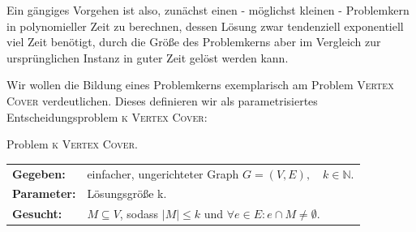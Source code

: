 \documentclass[a4paper,ngerman]{atseminar}
\newcommand{\N}{\ensuremath{\mathbb{N}}\xspace}
\begin{document}
\noindent
Ein gängiges Vorgehen ist also, zunächst einen - möglichst kleinen - Problemkern in polynomieller Zeit zu berechnen, dessen Lösung zwar tendenziell exponentiell viel Zeit benötigt,
durch die Größe des Problemkerns aber im Vergleich zur ursprünglichen Instanz in guter Zeit gelöst werden kann.

\noindent
Wir wollen die Bildung eines Problemkerns exemplarisch am Problem \textsc{Vertex Cover} verdeutlichen. Dieses definieren wir als
parametrisiertes Entscheidungsproblem \textsc{k Vertex Cover}:

\begin{definition}{Problem \textsc{k Vertex Cover}.}
  \\
  \begin{tabular}{ll}
    \textbf{Gegeben:} & einfacher, ungerichteter Graph  $G = (V, E), \quad k \in \N$. \\
    \textbf{Parameter:} & Lösungsgröße k. \\
    \textbf{Gesucht:} & $M \subseteq V$, sodass $ |M| \leq k $ und $ \forall e \in E : e \cap M \neq \emptyset$.
  \end{tabular}
\end{definition}
\end{document}

